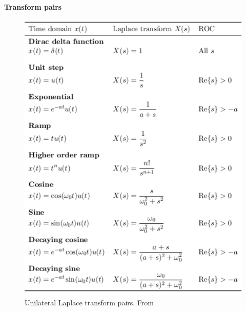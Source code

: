 \newpage
\textbf{Transform pairs}
\begin{figure}[!ht]
    \centering
    \includegraphics[width=12cm]{image/unilateral-Laplace-transform-pairs.pdf}
    \caption{Unilateral Laplace transform pairs. From \cite{}}
\end{figure}

